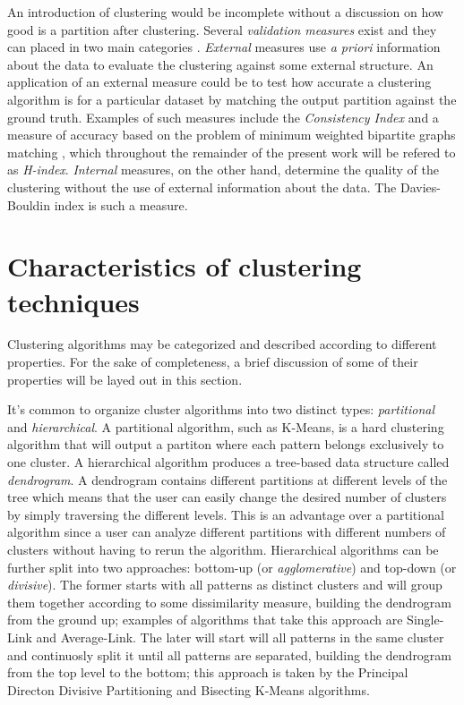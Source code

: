 An introduction of clustering would be incomplete without a discussion on how good is a partition after clustering.
Several \emph{validation measures} exist and they can placed in two main categories \cite{Aggarwal2014}.
\emph{External} measures use \emph{a priori} information about the data to evaluate the clustering against some external structure.
An application of an external measure could be to test how accurate a clustering algorithm is for a particular dataset by matching the output partition against the ground truth.
Examples of such measures include the \emph{Consistency Index} \cite{Fred2001} and a measure of accuracy based on the problem of minimum weighted bipartite graphs matching \cite{lange2004stability}, which throughout the remainder of the present work will be refered to as \emph{H-index}.
\emph{Internal} measures, on the other hand, determine the quality of the clustering without the use of external information about the data.
The Davies-Bouldin index \cite{davies1979cluster} is such a measure.



\section{Characteristics of clustering techniques}
\label{sec:clustering properties}

Clustering algorithms may be categorized and described according to different properties.
For the sake of completeness, a brief discussion of some of their properties will be layed out in this section.

It's common to organize cluster algorithms into two distinct types: \emph{partitional} and \emph{hierarchical}.
A partitional algorithm, such as K-Means, is a hard clustering algorithm that will output a partiton where each pattern belongs exclusively to one cluster.
A hierarchical algorithm produces a tree-based data structure called \emph{dendrogram}.
A dendrogram contains different partitions at different levels of the tree which means that the user can easily change the desired number of clusters by simply traversing the different levels.
This is an advantage over a partitional algorithm since a user can analyze different partitions with different numbers of clusters without having to rerun the algorithm.
Hierarchical algorithms can be further split into two approaches: bottom-up (or \emph{agglomerative}) and top-down (or \emph{divisive}).
The former starts with all patterns as distinct clusters and will group them together according to some dissimilarity measure, building the dendrogram from the ground up; examples of algorithms that take this approach are Single-Link and Average-Link.
The later will start will all patterns in the same cluster and continuosly split it until all patterns are separated, building the dendrogram from the top level to the bottom; this approach is taken by the Principal Directon Divisive Partitioning\cite{Boley1998} and Bisecting K-Means \cite{Steinbach2000} algorithms.


